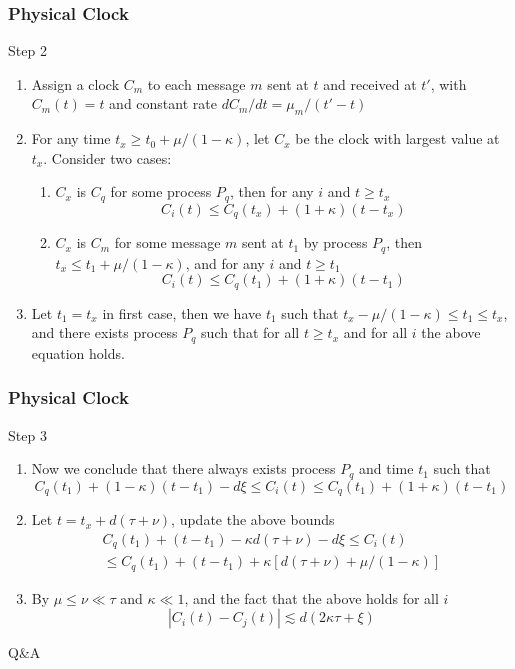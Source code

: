 \documentclass{beamer}
\begin{document}
\frame
{
  \frametitle{Physical Clock}
  \begin{block}{Step 2}
  \begin{enumerate}
  	\item<1-> Assign a clock $C_m$ to each message $m$ sent at $t$ and received at $t'$, with $C_m(t)=t$ and constant rate $dC_m/dt=\mu_m/(t'-t)$
  	\item<2-> For any time $t_x\geq t_0+\mu/(1-\kappa)$, let $C_x$ be the clock with largest value at $t_x$. Consider two cases:
  		\begin{enumerate}
  			\item<3-> $C_x$ is $C_q$ for some process $P_q$, then for any $i$ and $t\geq t_x$
  			\[C_i(t)\leq C_q(t_x)+(1+\kappa)(t-t_x)\]
  			\item<4-> $C_x$ is $C_m$ for some message $m$ sent at $t_1$ by process $P_q$, then $t_x\leq t_1+\mu/(1-\kappa)$, and for any $i$ and $t\geq t_1$
  			\[C_i(t)\leq C_q(t_1)+(1+\kappa)(t-t_1)\]
  		\end{enumerate}
  	\item<5-> Let $t_1=t_x$ in first case, then we have $t_1$ such that $t_x-\mu/(1-\kappa)\leq t_1\leq t_x$, and there exists process $P_q$ such that for all $t\geq t_x$ and for all $i$ the above equation holds.
  \end{enumerate}
  \end{block}
}

\frame
{
  \frametitle{Physical Clock}
  \begin{block}{Step 3}
  \begin{enumerate}
  	\item<1-> Now we conclude that there always exists process $P_q$ and time $t_1$ such that
  	\[C_q(t_1)+(1-\kappa)(t-t_1)-d\xi\leq C_i(t)\leq C_q(t_1)+(1+\kappa)(t-t_1)\]
  	\item<2-> Let $t=t_x+d(\tau+\nu)$, update the above bounds
  	\begin{eqnarray*}C_q(t_1)+(t-t_1)-\kappa d(\tau+\nu)-d\xi\leq C_i(t)\\\leq C_q(t_1)+(t-t_1)+\kappa[d(\tau+\nu)+\mu/(1-\kappa)]\end{eqnarray*}
  	\item<3-> By $\mu\leq\nu\ll\tau$ and $\kappa\ll 1$, and the fact that the above holds for all $i$
  	\[|C_i(t)-C_j(t)|\lesssim d(2\kappa\tau+\xi)\]
  \end{enumerate}
  \end{block}
}
\fi

\frame
{
  \center\huge{Q\&A}
}
\end{document}
